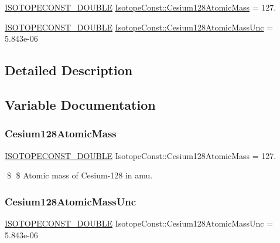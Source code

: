 \begin{DoxyCompactItemize}
\item 
\mbox{\hyperlink{group___isotope_const-_macros_ga8f45a7272ce02c0b4c65c44636ed719a}{I\+S\+O\+T\+O\+P\+E\+C\+O\+N\+S\+T\+\_\+\+D\+O\+U\+B\+LE}} \mbox{\hyperlink{group___isotope_const-_cesium-_cs128_ga7f66f75370ec3d5c43b048dbe284acd2}{Isotope\+Const\+::\+Cesium128\+Atomic\+Mass}} = 127.
\item 
\mbox{\hyperlink{group___isotope_const-_macros_ga8f45a7272ce02c0b4c65c44636ed719a}{I\+S\+O\+T\+O\+P\+E\+C\+O\+N\+S\+T\+\_\+\+D\+O\+U\+B\+LE}} \mbox{\hyperlink{group___isotope_const-_cesium-_cs128_ga9b43461c41d15561d089d7ded98d45f3}{Isotope\+Const\+::\+Cesium128\+Atomic\+Mass\+Unc}} = 5.\+843e-\/06
\end{DoxyCompactItemize}


\subsection{Detailed Description}


\subsection{Variable Documentation}
\mbox{\label{group___isotope_const-_cesium-_cs128_ga7f66f75370ec3d5c43b048dbe284acd2}} 
\subsubsection{\texorpdfstring{Cesium128\+Atomic\+Mass}{Cesium128AtomicMass}}
{\footnotesize\ttfamily \mbox{\hyperlink{group___isotope_const-_macros_ga8f45a7272ce02c0b4c65c44636ed719a}{I\+S\+O\+T\+O\+P\+E\+C\+O\+N\+S\+T\+\_\+\+D\+O\+U\+B\+LE}} Isotope\+Const\+::\+Cesium128\+Atomic\+Mass = 127.}

\$ \$ Atomic mass of Cesium-\/128 in amu. \mbox{\label{group___isotope_const-_cesium-_cs128_ga9b43461c41d15561d089d7ded98d45f3}} 
\subsubsection{\texorpdfstring{Cesium128\+Atomic\+Mass\+Unc}{Cesium128AtomicMassUnc}}
{\footnotesize\ttfamily \mbox{\hyperlink{group___isotope_const-_macros_ga8f45a7272ce02c0b4c65c44636ed719a}{I\+S\+O\+T\+O\+P\+E\+C\+O\+N\+S\+T\+\_\+\+D\+O\+U\+B\+LE}} Isotope\+Const\+::\+Cesium128\+Atomic\+Mass\+Unc = 5.\+843e-\/06}

